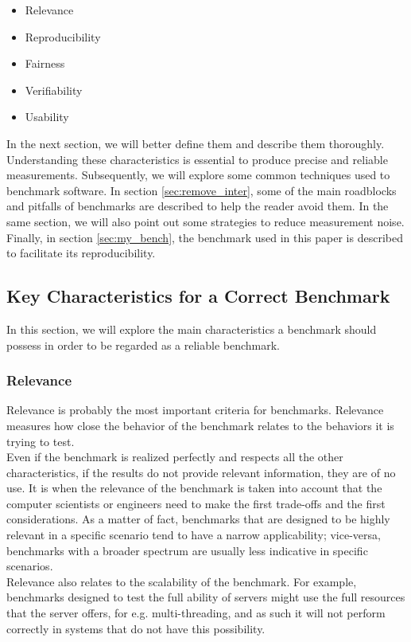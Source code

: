 \begin{itemize}
    \item Relevance
    \item Reproducibility
    \item Fairness
    \item Verifiability
    \item Usability
\end{itemize}
In the next section, we will better define them and describe them thoroughly. Understanding these characteristics is essential to produce precise and reliable measurements. Subsequently, we will explore some common techniques used to benchmark software. In section \ref{sec:remove_inter}, some of the main roadblocks and pitfalls of benchmarks are described to help the reader avoid them. In the same section, we will also point out some strategies to reduce measurement noise. Finally, in section \ref{sec:my_bench}, the benchmark used in this paper is described to facilitate its reproducibility. \\









\subsection{Key Characteristics for a Correct Benchmark}\label{key_char}
In this section, we will explore the main characteristics a benchmark should possess in order to be regarded as a reliable benchmark.
\subsubsection{Relevance}
Relevance is probably the most important criteria for benchmarks. Relevance measures how close the behavior of the benchmark relates to the behaviors it is trying to test. \cite{how_to_bench}\\
Even if the benchmark is realized perfectly and respects all the other characteristics, if the results do not provide relevant information, they are of no use. It is when the relevance of the benchmark is taken into account that the computer scientists or engineers need to make the first trade-offs and the first considerations. As a matter of fact, benchmarks that are designed to be highly relevant in a specific scenario tend to have a narrow applicability; vice-versa, benchmarks with a broader spectrum are usually less indicative in specific scenarios. \cite{how_to_bench}\\
Relevance also relates to the scalability of the benchmark. For example, benchmarks designed to test the full ability of servers might use the full resources that the server offers, for e.g. multi-threading, and as such it will not perform correctly in systems that do not have this possibility. \cite{how_to_bench}

